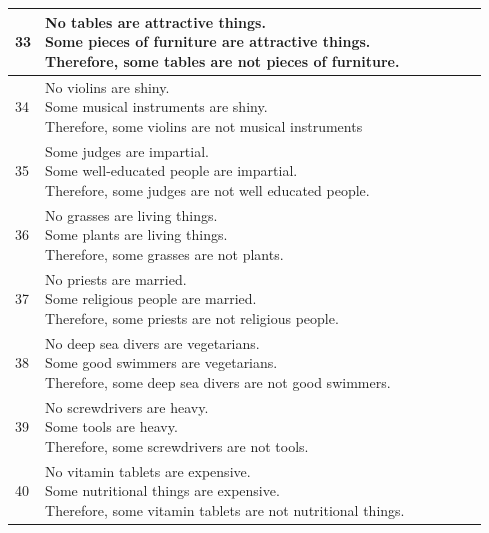 \documentclass[10pt]{article}
\newcommand{\ptick}{\ding{51}}
\begin{document}
\begin{center}
\begin{tabular}{|l|l|c|c|c|c|c|}
			33 &\makecell[l]{No tables are attractive things.\\Some pieces of furniture are attractive things.\\Therefore, some tables are not pieces of furniture.} & &\ptick& & \ptick& \ptick\\ \hline
			34 &\makecell[l]{No violins are shiny.\\Some musical instruments are shiny.\\Therefore, some violins are not musical instruments}  & &\ptick& & \ptick& \ptick\\  \hline
			35 &\makecell[l]{Some judges are impartial.\\Some well-educated people are impartial.\\Therefore, some judges are not well educated people.}  & &\ptick& & \ptick& \ptick \\ \hline
			36 &\makecell[l]{No grasses are living things.\\Some plants are living things.\\Therefore, some grasses are not plants.}  & &\ptick& & \ptick& \ptick \\ \hline
			37 &\makecell[l]{No priests are married.\\Some religious people are married.\\Therefore, some priests are not religious people.} & &\ptick& & \ptick& \ptick\\ \hline
			38 &\makecell[l]{No deep sea divers are vegetarians.\\Some good swimmers are vegetarians.\\Therefore, some deep sea divers are not good swimmers.}& &\ptick& & \ptick& \ptick\\ \hline
			39 &\makecell[l]{No screwdrivers are heavy.\\Some tools are heavy.\\Therefore, some screwdrivers are not tools.}& &\ptick& & \ptick& \ptick\\ \hline
			40 &\makecell[l]{No vitamin tablets are expensive.\\Some nutritional things are expensive.\\Therefore, some vitamin tablets are not nutritional things.}& &\ptick& & \ptick& \ptick\\ \hline		
		\end{tabular}
	\end{center}
	
\end{document}
